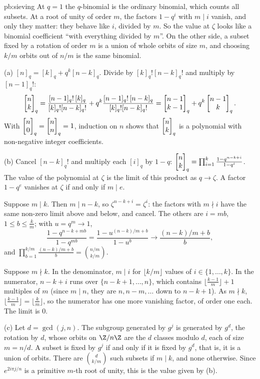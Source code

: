 \begin{solution}{pb:sieving}
\idea At $q=1$ the $q$-binomial is the ordinary binomial, which counts all subsets. At a root of unity of order $m$, the
factors $1-q^i$ with $m\mid i$ vanish, and only they matter: they behave like $i$, divided by $m$. So the value at $\zeta$
looks like a binomial coefficient ``with everything divided by $m$''. On the other side, a subset fixed by a rotation of
order $m$ is a union of whole orbits of size $m$, and choosing $k/m$ orbits out of $n/m$ is the same binomial.

\writeup (a) $[n]_q=[k]_q+q^k[n-k]_q$. Divide by $[k]_q![n-k]_q!$ and multiply by $[n-1]_q!$:
\[
\begin{bmatrix}n\\k\end{bmatrix}_q=\frac{[n-1]_q!\,[k]_q}{[k]_q![n-k]_q!}+q^k\frac{[n-1]_q!\,[n-k]_q}{[k]_q![n-k]_q!}=\begin{bmatrix}n-1\\k-1\end{bmatrix}_q+q^k\begin{bmatrix}n-1\\k\end{bmatrix}_q.
\]
With $\begin{bmatrix}n\\0\end{bmatrix}_q=\begin{bmatrix}n\\n\end{bmatrix}_q=1$, induction on $n$ shows that $\begin{bmatrix}n\\k\end{bmatrix}_q$ is a polynomial with non-negative integer
coefficients.

(b) Cancel $[n-k]_q!$ and multiply each $[i]_q$ by $1-q$:
$\begin{bmatrix}n\\k\end{bmatrix}_q=\prod_{i=1}^k\frac{1-q^{n-k+i}}{1-q^i}$. The value of the polynomial at $\zeta$ is the limit of this product as
$q\to\zeta$. A factor $1-q^e$ vanishes at $\zeta$ if and only if $m\mid e$.

Suppose $m\mid k$. Then $m\mid n-k$, so $\zeta^{n-k+i}=\zeta^i$: the factors with $m\nmid i$ have the same non-zero limit above
and below, and cancel. The others are $i=mb$, $1\le b\le\frac km$; with $u=q^m\to1$,
\[
\frac{1-q^{n-k+mb}}{1-q^{mb}}=\frac{1-u^{(n-k)/m+b}}{1-u^b}\longrightarrow\frac{(n-k)/m+b}b,
\]
and $\prod_{b=1}^{k/m}\frac{(n-k)/m+b}b=\binom{n/m}{k/m}$.

Suppose $m\nmid k$. In the denominator, $m\mid i$ for $\lfloor k/m\rfloor$ values of $i\in\{1,\dots,k\}$. In the numerator,
$n-k+i$ runs over $\{n-k+1,\dots,n\}$, which contains $\lfloor\frac{k-1}m\rfloor+1$ multiples of $m$ (since $m\mid n$, they are
$n,n-m,\dots$ down to $n-k+1$). As $m\nmid k$, $\lfloor\frac{k-1}m\rfloor=\lfloor\frac km\rfloor$, so the numerator has one
more vanishing factor, of order one each. The limit is $0$.

(c) Let $d=\gcd(j,n)$. The subgroup generated by $g^j$ is generated by $g^d$, the rotation by $d$, whose orbits on
$\Z/n\Z$ are the $d$ classes modulo $d$, each of size $m=n/d$. A subset is fixed by $g^j$ if and only if it is fixed by
$g^d$, that is, it is a union of orbits. There are $\binom d{k/m}$ such subsets if $m\mid k$, and none otherwise. Since
$e^{2i\pi j/n}$ is a primitive $m$-th root of unity, this is the value given by (b).


\end{solution}
